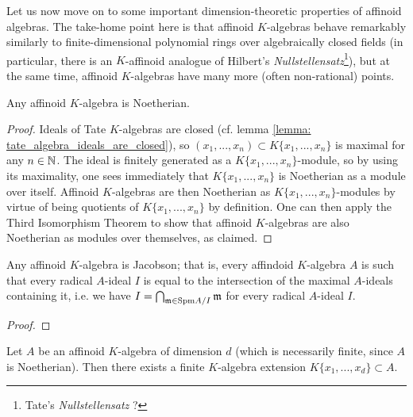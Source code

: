             Let us now move on to some important dimension-theoretic properties of affinoid algebras. The take-home point here is that affinoid $K$-algebras behave remarkably similarly to finite-dimensional polynomial rings over algebraically closed fields (in particular, there is an $K$-affinoid analogue of Hilbert's \textit{Nullstellensatz}\footnote{Tate's \textit{Nullstellensatz} ?}), but at the same time, affinoid $K$-algebras have many more (often non-rational) points.
            \begin{proposition} \label{prop: affinoid_algebras_are_noetherian}
                Any affinoid $K$-algebra is Noetherian.
            \end{proposition}
                \begin{proof}
                    Ideals of Tate $K$-algebras are closed (cf. lemma \ref{lemma: tate_algebra_ideals_are_closed}), so $(x_1, ..., x_n) \subset K\{x_1, ..., x_n\}$ is maximal for any $n \in \mathbb{N}$. The ideal is finitely generated as a $K\{x_1, ..., x_n\}$-module, so by using its maximality, one sees immediately that $K\{x_1, ..., x_n\}$ is Noetherian as a module over itself. Affinoid $K$-algebras are then Noetherian as $K\{x_1, ..., x_n\}$-modules by virtue of being quotients of $K\{x_1, ..., x_n\}$ by definition. One can then apply the Third Isomorphism Theorem to show that affinoid $K$-algebras are also Noetherian as modules over themselves, as claimed.
                \end{proof}
            \begin{proposition} \label{prop: affinoid_algebras_are_jacobson}
                Any affinoid $K$-algebra is Jacobson; that is, every affindoid $K$-algebra $A$ is such that every radical $A$-ideal $I$ is equal to the intersection of the maximal $A$-ideals containing it, i.e. we have $I = \bigcap_{\mathfrak{m} \in \mathrm{Spm} A/I} \mathfrak{m}$ for every radical $A$-ideal $I$.
            \end{proposition}
                \begin{proof}
                    
                \end{proof}
            \begin{proposition} \label{prop: affinoid_algebras_admit_noetherian_normalisation}
                Let $A$ be an affinoid $K$-algebra of dimension $d$ (which is necessarily finite, since $A$ is Noetherian). Then there exists a finite $K$-algebra extension $K\{x_1, ..., x_d\} \subset A$.
            \end{proposition}
